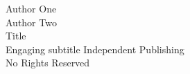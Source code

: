 \documentclass[../main.tex]{subfiles}
\begin{document}
\begin{titlingpage}
	\begin{center}
		Author One\\
		Author Two\\
		\vfill
		\Huge
		Title\\
		\Large
		Engaging subtitle
		\vfill
		\small
		Independent Publishing\\
		No Rights Reserved
	\end{center}
\end{titlingpage}
\end{document}
